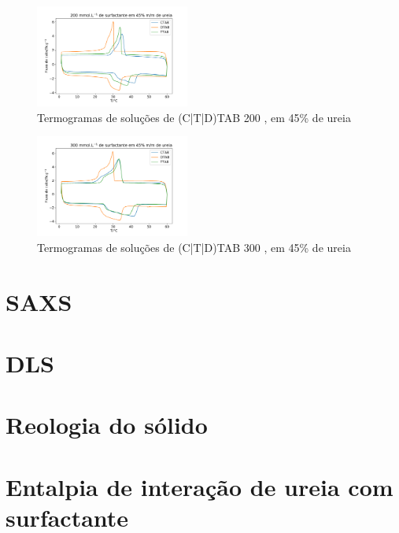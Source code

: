 		\begin{figure}[h]
			\centering
			\includegraphics[width=0.45\textwidth]{./imagens/dsc/Surf_200mm_45p}
			\caption{Termogramas de soluções de (C|T|D)TAB 200 \mM{}, em 45\% de ureia}
			\label{fig:DSC_Surf_200mm_45p}
		\end{figure}
	
		\begin{figure}[h]
			\centering
			\includegraphics[width=0.45\textwidth]{./imagens/dsc/Surf_300mm_45p}
			\caption{Termogramas de soluções de (C|T|D)TAB 300 \mM{}, em 45\% de ureia}
			\label{fig:DSC_Surf_300mm_45p}
		\end{figure}
	
		
		
		
	\section{SAXS}
	\section{DLS}
	\section{Reologia do sólido}
	\section{Entalpia de interação de ureia com surfactante}